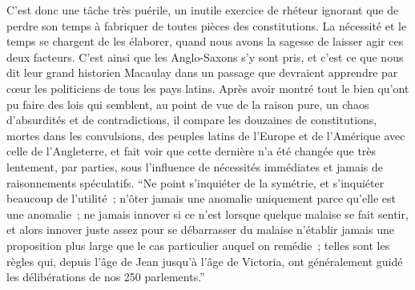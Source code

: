 \documentclass[french,twoside]{book} %
\begin{document}
C’est donc une tâche très puérile, un inutile exercice de rhéteur ignorant que de perdre son temps à fabriquer de toutes pièces des constitutions. La nécessité et le temps se chargent de les élaborer, quand nous avons la sagesse de laisser agir ces deux facteurs. C’est ainsi que les Anglo-Saxons s’y sont pris, et c’est ce que nous dit leur grand historien Macaulay dans un passage que devraient apprendre par cœur les politiciens de tous les pays latins. Après avoir montré tout le bien qu’ont pu faire des lois qui semblent, au point de vue de la raison pure, un chaos d’absurdités et de con­tradictions, il compare les douzaines de constitutions, mortes dans les convulsions, des peuples latins de l’Europe et de l’Amérique avec celle de l’Angleterre, et fait voir que cette dernière n’a été changée que très lentement, par parties, sous l’influence de nécessités immédiates et jamais de raisonnements spéculatifs. “Ne point s’inquiéter de la symétrie, et s’inquiéter beaucoup de l’utilité ; n’ôter jamais une anomalie unique­ment parce qu’elle est une anomalie ; ne jamais innover si ce n’est lorsque quelque malaise se fait sentir, et alors innover juste assez pour se débarrasser du malaise n’établir jamais une proposition plus large que le cas particulier auquel on remédie ; telles sont les règles qui, depuis l’âge de Jean jusqu’à l’âge de Victoria, ont généralement guidé les délibérations de nos 250 parlements.”\par
\end{document}

